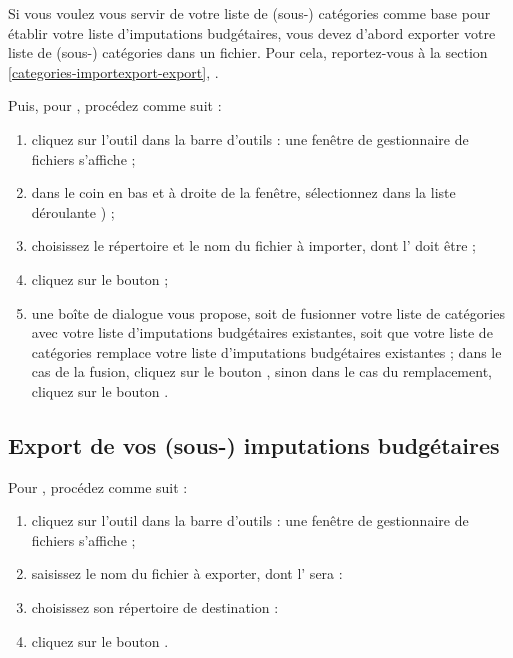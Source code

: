 Si vous voulez vous servir de votre liste de (sous-) catégories comme base pour établir votre liste d'imputations budgétaires, vous devez d'abord exporter votre liste de (sous-) catégories dans un fichier. Pour cela, reportez-vous à la section \vref{categories-importexport-export}, . 

Puis, pour , procédez comme suit : 

\begin{enumerate}
	 \item cliquez sur l'outil  dans la barre d'outils : une fenêtre de gestionnaire de fichiers s'affiche ;
	 \item dans le coin en bas et à droite de la fenêtre, sélectionnez dans la liste déroulante ) ;
	 \item choisissez le répertoire et le nom du fichier à importer, dont l' doit être  ;
	 \item cliquez sur le bouton  ; 
	 \item une boîte de dialogue vous propose, soit de fusionner votre liste de catégories avec votre liste d'imputations budgétaires existantes, soit que votre liste de catégories remplace votre liste d'imputations budgétaires existantes ; dans le cas de la fusion, cliquez sur le bouton , sinon dans le cas du remplacement, cliquez sur le bouton .
\end{enumerate}


\subsection{Export de vos (sous-) imputations budgétaires\label{budgetarylines-importexport-budgetary}}

Pour , procédez comme suit :

\begin{enumerate}
	 \item cliquez sur l'outil  dans la barre d'outils : une fenêtre de gestionnaire de fichiers s'affiche ;
	 \item saisissez le nom du fichier à exporter, dont l' sera  :
	 \item choisissez son répertoire de destination :
	 \item cliquez sur le bouton .
\end{enumerate}


